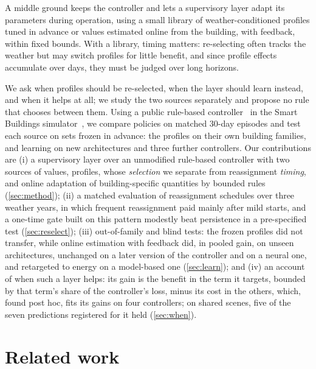 \documentclass{article}
\begin{document}
A middle ground keeps the controller and lets a supervisory layer adapt its parameters during operation, using a small
library of weather-conditioned profiles tuned in advance or values estimated online from the building, with feedback, within fixed bounds.
With a library, timing matters: re-selecting often tracks the weather but may switch profiles for little benefit, and
since profile effects accumulate over days, they must be judged over long horizons.

We ask when profiles should be re-selected, when the layer should learn instead, and when it helps at all; we study
the two sources separately and propose no rule that chooses between them. Using a public
rule-based controller~\cite{malyshev2026k07} in the Smart Buildings simulator~\cite{goldfeder2024suite,goldfeder2026challenge},
we compare policies on matched 30-day episodes and test each source on sets frozen in advance: the profiles on their own
building families, and learning on new architectures and three further controllers. Our contributions are (i) a supervisory layer over an unmodified rule-based controller with two sources of values,
profiles, whose \emph{selection} we separate from reassignment \emph{timing}, and online adaptation of
building-specific quantities by bounded rules (\cref{sec:method}); (ii) a matched evaluation of reassignment
schedules over three weather years, in which frequent reassignment paid mainly after mild starts, and a one-time gate
built on this pattern modestly beat persistence in a pre-specified test (\cref{sec:reselect}); (iii) out-of-family
and blind tests: the frozen profiles did not transfer, while online estimation with feedback did, in pooled gain, on unseen architectures, unchanged on a
later version of the controller and on a neural one, and retargeted to energy on a model-based one (\cref{sec:learn}); and (iv) an account of when such a layer helps: its gain is the benefit in
the term it targets, bounded by that term's share of the controller's loss, minus its cost in the others, which, found post hoc,
fits its gains on four controllers; on shared scenes, five of the seven
predictions registered for it held (\cref{sec:when}).

\section{Related work}\label{sec:related}
\end{document}
